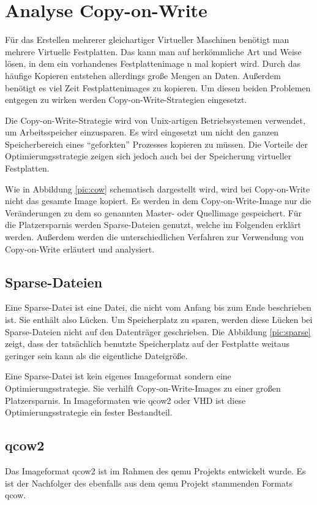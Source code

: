 \chapter{Analyse Copy-on-Write}
Für das Erstellen mehrerer gleichartiger Virtueller Maschinen benötigt man mehrere Virtuelle Festplatten. Das kann man auf herkömmliche Art und Weise lösen, in dem ein vorhandenes Festplattenimage n mal kopiert wird. Durch das häufige Kopieren entstehen allerdings große Mengen an Daten. Außerdem benötigt es viel Zeit Festplattenimages zu kopieren. Um diesen beiden Problemen entgegen zu wirken werden Copy-on-Write-Strategien eingesetzt.

Die Copy-on-Write-Strategie wird von Unix-artigen Betriebsystemen verwendet, um Arbeitsspeicher einzusparen. Es wird eingesetzt um nicht den ganzen Speicherbereich eines ``geforkten'' Prozesses kopieren zu müssen. Die Vorteile der Optimierungsstrategie zeigen sich jedoch auch bei der Speicherung virtueller Festplatten. \cite{linuxcow}

Wie in Abbildung \ref{pic:cow} schematisch dargestellt wird, wird bei Copy-on-Write nicht das gesamte Image kopiert. Es werden in dem Copy-on-Write-Image nur die Veränderungen zu dem so genannten Master- oder Quellimage gespeichert. Für die Platzersparnis werden Sparse-Dateien genutzt, welche im Folgenden erklärt werden. Außerdem werden die unterschiedlichen Verfahren zur Verwendung von Copy-on-Write erläutert und analysiert.

\section{Sparse-Dateien}
Eine Sparse-Datei ist eine Datei, die nicht vom Anfang bis zum Ende beschrieben ist. Sie enthält also Lücken. Um Speicherplatz zu sparen, werden diese Lücken bei Sparse-Dateien nicht auf den Datenträger geschrieben. Die Abbildung \ref{pic:sparse} zeigt, dass der tatsächlich benutzte Speicherplatz auf der Festplatte weitaus geringer sein kann als die eigentliche Dateigröße.


Eine Sparse-Datei ist kein eigenes Imageformat sondern eine Optimierungsstrategie. Sie verhilft Copy-on-Write-Images zu einer großen Platzersparnis. In Imageformaten wie qcow2 oder VHD ist diese Optimierungsstrategie ein fester Bestandteil. \cite{sparse}

\section{qcow2}
Das Imageformat qcow2 ist im Rahmen des qemu Projekts entwickelt wurde. Es ist der Nachfolger des ebenfalls aus dem qemu Projekt stammenden Formats qcow. \cite{qcowmarkmc} \cite{qemuwiki}


